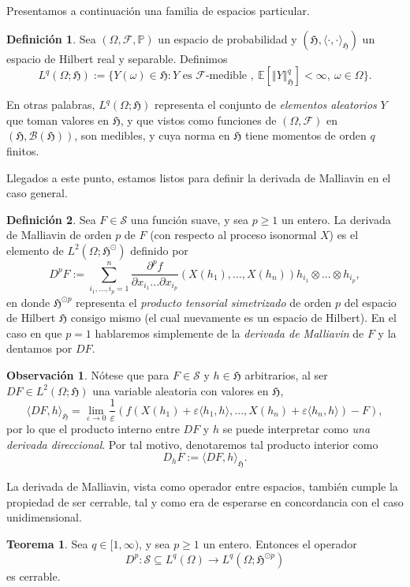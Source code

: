 \documentclass[letterpaper,twoside,12pt]{book}
\newcommand{\F}{\mathcal{F}}
\newcommand{\B}{\mathcal{B}}
\renewcommand{\S}{\mathcal{S}}
\newcommand{\E}{\mathbb{E}}
\renewcommand{\P}{\mathbb{P}}
\newcommand{\1}{\mathds{1}}
\renewcommand{\to}{\rightarrow}
\newcommand{\norm}[1]{\left\Vert #1 \right\Vert}
\theoremstyle{definition}
\newtheorem{dfn}{Definición}
\theoremstyle{definition}
\newtheorem{teo}{Teorema}
\theoremstyle{remark}
\theoremstyle{definition}
\theoremstyle{definition}
\theoremstyle{definition}
\newtheorem{obs}{Observación}
\theoremstyle{definition}
\theoremstyle{definition}
\begin{document}
Presentamos a continuación una familia de espacios particular.

\begin{dfn} 
 Sea $(\Omega, \F, \P)$ un espacio de probabilidad y $(\mathfrak{H},\langle \cdot,\cdot\rangle_{\mathfrak{H}})$ un espacio de Hilbert real y separable. Definimos 
 \[
 L^q(\Omega;\mathfrak{H}):=\{Y(\omega)\in \mathfrak{H}:Y \text{ es }\F \text{-medible },\ \E\left[\norm{Y}_{\mathfrak{H}}^q\right]<\infty, \ \omega \in \Omega\}.
 \]
 \end{dfn}
 En otras palabras, $L^q(\Omega;\mathfrak{H})$ representa el conjunto de \textit{elementos aleatorios} $Y$ que toman valores en $\mathfrak{H}$, y que vistos como funciones de $(\Omega,\F)$ en $(\mathfrak{H},\B(\mathfrak{H}))$, son medibles, y cuya norma en $\mathfrak{H}$ tiene momentos de orden $q$ finitos. 

Llegados a este punto, estamos listos para definir la derivada de Malliavin en el caso general.
\begin{dfn} 
 Sea $F\in \S$ una función suave, y sea $p\geq1$ un entero. La derivada de Malliavin de orden $p$ de $F$ (con respecto al proceso isonormal $X$) es el elemento de $L^2(\Omega;\mathfrak{H}^{\odot})$ definido por 
 \[
 D^pF:=\sum_{i_1,...,i_p=1}^{n}\frac{\partial^pf}{\partial x_{i_1}...\partial x_{i_p}}(X(h_1),...,X(h_n))h_{i_1}\otimes...\otimes h_{i_p},
 \] 
 en donde $\mathfrak{H}^{\odot p}$ representa el \textit{producto tensorial simetrizado} de orden $p$ del espacio de Hilbert $\mathfrak{H}$ consigo mismo (el cual nuevamente es un espacio de Hilbert). En el caso en que $p=1$ hablaremos simplemente de la \textit{derivada de Malliavin} de $F$ y la dentamos por $DF$.
 \end{dfn}
 \begin{obs}
   Nótese que para $F\in \S$ y $h\in \mathfrak{H}$ arbitrarios, al ser $DF\in L^2(\Omega;\mathfrak{H})$ una variable aleatoria con valores en $\mathfrak{H}$, 
   \[
   \langle DF,h\rangle_{\mathfrak{H}}=\lim_{\varepsilon\to 0} \frac{1}{\varepsilon}\left(f(X(h_1)+\varepsilon \langle h_1,h\rangle,...,X(h_n)+\varepsilon \langle h_n,h\rangle)-F\right),
   \]
   por lo que el producto interno entre $DF$ y $h$ se puede interpretar como \textit{una derivada direccional}. Por tal motivo, denotaremos tal producto interior como  
   \[
   D_hF:=\langle DF,h\rangle_{\mathfrak{H}}.
   \]
 \end{obs}
 La derivada de Malliavin, vista como operador entre espacios, también cumple la propiedad de ser cerrable, tal y como era de esperarse en concordancia con el caso unidimensional.
 \begin{teo} 
  Sea $q\in [1,\infty)$, y sea $p\geq 1$ un entero. Entonces el operador 
  \[
  D^{p}:\S\subseteq L^q(\Omega)\to L^q(\Omega;\mathfrak{H}^{\odot p})
  \]
  es cerrable.
  \end{teo}
\end{document}
